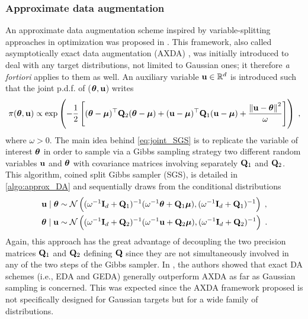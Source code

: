 \documentclass[nohypdvips,onefignum,onetabnum]{siamart171218}
\begin{document}
\subsubsection{Approximate data augmentation} \label{subsec:data_aug_approx}
An approximate data augmentation scheme inspired by variable-splitting approaches in optimization \cite{Boyd2011,Afonso2010,Afonso2011} was proposed in \cite{Vono2019}. This framework, also called asymptotically exact data augmentation (AXDA) \cite{Vono_2019sub}, was initially introduced to deal with any target distributions, not limited to Gaussian ones; it therefore {\em a fortiori} applies to them as well. 
%
An auxiliary variable $\mathbf{u} \in \mathbb{R}^d$ is introduced such that the joint p.d.f. of ($\boldsymbol{\theta},\mathbf{u}$) writes
{\small
\begin{align}
  \pi(\Bs{\theta},\B{u}) \propto \exp\pr{- \dfrac{1}{2}\br{(\Bs{\theta}-\Bs{\mu})^{\top}\B{Q}_2(\Bs{\theta}-\Bs{\mu}) +  (\B{u}-\Bs{\mu})^{\top}\B{Q}_1(\B{u}-\Bs{\mu}) + \dfrac{\nr{\B{u}-\Bs{\theta}}^2}{\omega}}}\eqsp,
  \label{eq:joint_SGS}
\end{align}
}
where $\omega > 0$.
The main idea behind \cref{eq:joint_SGS} is to replicate the variable of interest $\boldsymbol{\theta}$ in order to sample via a Gibbs sampling strategy two different random variables $\mathbf{u}$ and $\boldsymbol{\theta}$ with covariance matrices involving separately $\mathbf{Q}_1$ and $\mathbf{Q}_2$.
This algorithm, coined split Gibbs sampler (SGS), is detailed in \cref{algo:approx_DA} and sequentially draws from the conditional distributions
\begin{align}
  \B{u} \mid \Bs{\theta} &\sim \mathcal{N}\pr{(\omega^{-1}\B{I}_d + \B{Q}_1)^{-1}(\omega^{-1}\Bs{\theta} + \B{Q}_1\Bs{\mu}),(\omega^{-1}\B{I}_d + \B{Q}_1)^{-1}}\eqsp, \label{eq:SGS_u}\\
  \Bs{\theta} \mid \B{u} &\sim \mathcal{N}\pr{(\omega^{-1}\B{I}_d + \B{Q}_2)^{-1}(\omega^{-1}\B{u} + \B{Q}_2\Bs{\mu}),(\omega^{-1}\B{I}_d + \B{Q}_2)^{-1}}\eqsp. \label{eq:SGS_theta}
\end{align}
Again, this approach has the great advantage of decoupling the two precision matrices $\mathbf{Q}_1$ and $\mathbf{Q}_2$ defining $\mathbf{Q}$ since they are not simultaneously involved in any of the two steps of the Gibbs sampler. In \cite{Marnissi2019}, the authors showed that exact DA schemes (i.e., EDA and GEDA) generally outperform AXDA as far as Gaussian sampling is concerned. This was expected since the AXDA framework proposed is not specifically designed for Gaussian targets but for a wide family of distributions.
\end{document}
